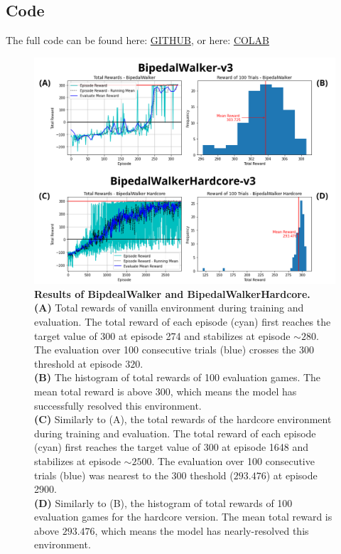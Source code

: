 \documentclass{article}
\begin{document}
\begin{multicols}{2}
\section{Code}
The full code can be found here:
\href{https://github.com/JudahGazit/reinforcement-learning-project}{GITHUB}, or here:
\href{https://colab.research.google.com/drive/1_gxpvbnFv3lCQh4Ce_f1osPcGhwog27W?usp=sharing}{COLAB} 






 \begin{figure}
 \includegraphics[width=\textwidth]{scores}
 \caption{
 \label{fig:scores}
 \textbf{Results of BipdealWalker and BipedalWalkerHardcore.} \\
 \textbf{(A)} Total rewards of vanilla environment during training and evaluation. The total reward of each episode (cyan) first reaches the target value of 300 at episode 274 and stabilizes at episode $\sim 280$. The evaluation over 100 consecutive trials (blue) crosses the 300 threshold at episode $320$. \\
 \textbf{(B)} The histogram of total rewards of 100 evaluation games. The mean total reward is above 300, which means the model has successfully resolved this environment. \\
 \textbf{(C)} Similarly to (A), the total rewards of the hardcore environment during training and evaluation. The total reward of each episode (cyan) first reaches the target value of 300 at episode 1648 and stabilizes at episode $\sim 2500$. The evaluation over 100 consecutive trials (blue) was nearest to the 300 theshold ($293.476$) at episode 2900. \\
 \textbf{(D)} Similarly to (B), the histogram of total rewards of 100 evaluation games for the hardcore version. The mean total reward is above $293.476$, which means the model has nearly-resolved this environment.
 }
 \end{figure}

\end{multicols}
\end{document}
